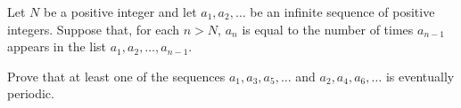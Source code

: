Let $N$ be a positive integer and let $a_1, a_2, \ldots$ be an infinite sequence of positive integers. Suppose that, for each $n > N$, $a_n$ is equal to the number of times $a_{n-1}$ appears in the list $a_1, a_2, \ldots, a_{n-1}$.

Prove that at least one of the sequences $a_1, a_3, a_5, \ldots$ and $a_2, a_4, a_6, \ldots$ is eventually periodic.
